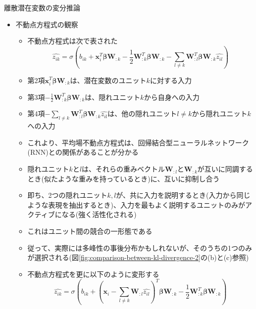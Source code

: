 \documentclass[dvipdfmx,notheorems,t]{beamer}
\begin{document}
\begin{frame}{離散潜在変数の変分推論}
\begin{itemize}
	\item 不動点方程式の観察
	\begin{itemize}
		\item 不動点方程式は次で表された
		\begin{equation}
			\widehat{z_{ik}} = \sigma \left( b_{ik} + \bm{x}_i^T \bm{\beta} \bm{W}_{:k} - \frac{1}{2} \bm{W}_{:k}^T \bm{\beta} \bm{W}_{:k} - \sum_{l \neq k} \bm{W}_{:l}^T \bm{\beta} \bm{W}_{:k} \widehat{z_{il}} \right)
		\end{equation}
		
		\item 第2項$\bm{x}_i^T \bm{\beta} \bm{W}_{:k}$は、潜在変数のユニット$k$に対する入力
		\item 第3項$- \frac{1}{2} \bm{W}_{:k}^T \bm{\beta} \bm{W}_{:k}$は、隠れユニット$k$から自身への入力
		\item 第4項$- \sum_{l \neq k} \bm{W}_{:l}^T \bm{\beta} \bm{W}_{:k} \widehat{z_{il}}$は、他の隠れユニット$l \neq k$から隠れユニット$k$への入力
		\newline
		
		\item これより、平均場不動点方程式は、回帰結合型ニューラルネットワーク(RNN)との関係があることが分かる
		\newline
		
		\item 隠れユニット$k$と$l$は、それらの重みベクトル$\bm{W}_{:l}$と$\bm{W}_{:k}$が互いに同調するとき(\alert{似たような重みを持っているとき})に、\alert{互いに抑制し合う}
		\item 即ち、2つの隠れユニット$k, l$が、共に入力を説明するとき(入力から同じような表現を抽出するとき)、\alert{入力を最もよく説明するユニットのみがアクティブ}になる(強く活性化される)
		\item これはユニット間の競合の一形態である
		\newline
		
		\item 従って、実際には多峰性の事後分布かもしれないが、そのうちの1つのみが選択される(図\ref{fig:comparison-between-kl-divergence-2}の(b)と(c)参照)
		\newline
		
		\item 不動点方程式を更に以下のように変形する
		\begin{equation}
			\widehat{z_{ik}} = \sigma \left( b_{ik} + \left( \bm{x}_i - \sum_{l \neq k} \bm{W}_{:l} \widehat{z_{il}} \right)^T \bm{\beta} \bm{W}_{:k} - \frac{1}{2} \bm{W}_{:k}^T \bm{\beta} \bm{W}_{:k} \right)
		\end{equation}
		

\end{itemize}
\end{itemize}
\end{frame}
\end{document}
